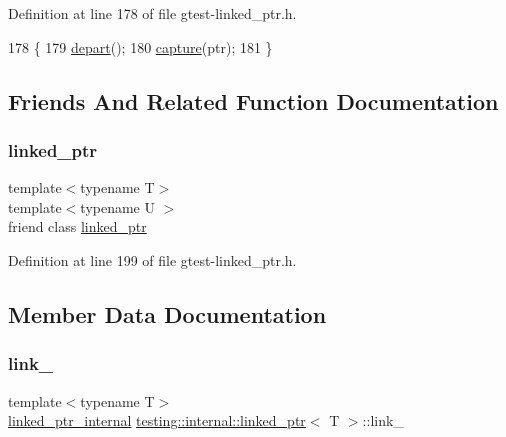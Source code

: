 Definition at line 178 of file gtest-\/linked\+\_\+ptr.\+h.


\begin{DoxyCode}
178                             \{
179     \hyperlink{classtesting_1_1internal_1_1linked__ptr_a0852ab20839140f29b2ad074339fccc7}{depart}();
180     \hyperlink{classtesting_1_1internal_1_1linked__ptr_a0b4623795339fd29bf9303f926ae2824}{capture}(ptr);
181   \}
\end{DoxyCode}


\subsection{Friends And Related Function Documentation}
\mbox{\label{classtesting_1_1internal_1_1linked__ptr_a7763f286ca03a7f7363a033d996c8c1c}} 
\subsubsection{\texorpdfstring{linked\+\_\+ptr}{linked\_ptr}}
{\footnotesize\ttfamily template$<$typename T$>$ \\
template$<$typename U $>$ \\
friend class \hyperlink{classtesting_1_1internal_1_1linked__ptr}{linked\+\_\+ptr}\hspace{0.3cm}{\ttfamily [friend]}}



Definition at line 199 of file gtest-\/linked\+\_\+ptr.\+h.



\subsection{Member Data Documentation}
\mbox{\label{classtesting_1_1internal_1_1linked__ptr_a8fdfa75fea8bfc10825a3cc53c50461f}} 
\subsubsection{\texorpdfstring{link\+\_\+}{link\_}}
{\footnotesize\ttfamily template$<$typename T$>$ \\
\hyperlink{classtesting_1_1internal_1_1linked__ptr__internal}{linked\+\_\+ptr\+\_\+internal} \hyperlink{classtesting_1_1internal_1_1linked__ptr}{testing\+::internal\+::linked\+\_\+ptr}$<$ T $>$\+::link\+\_\+\hspace{0.3cm}{\ttfamily [private]}}



